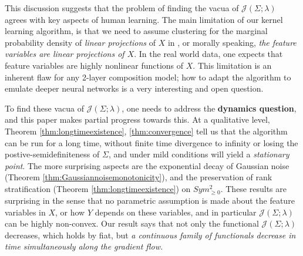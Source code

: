 \documentclass[a4paper]{article}
\theoremstyle{definition}
\newcommand{\1}{\mathbbm{1}}
\begin{document}
	
	
	
	This discussion suggests that the problem of finding the vacua of $\mathcal{J}(\Sigma;\lambda)$ agrees with key aspects of human learning. The main limitation of our kernel learning algorithm, is that we need to assume clustering for the marginal probability density of \emph{linear projections} of $X$ in \cite{RuanLi}, or morally speaking, \emph{the feature variables are linear projections of $X$}. In the real world data, one expects that feature variables are highly nonlinear functions of $X$. This limitation is an inherent flaw for any 2-layer composition model; how to adapt the algorithm to emulate deeper neural networks is a very interesting and open question.
	
	
	
	
	
	
	
	To find these vacua of $\mathcal{J}(\Sigma;\lambda)$, one needs to address the \textbf{dynamics question}, and this paper makes partial progress towards this. At a qualitative level, Theorem \ref{thm:longtimeexistence}, \ref{thm:convergence} tell us that the algorithm can be run for a long time, without finite time divergence to infinity or losing the postive-semidefiniteness of $\Sigma$, and under mild conditions will yield a \emph{stationary point}. The more surprising aspects are the exponential decay of Gaussian noise (Theorem \ref{thm:Gaussiannoisemonotonicity}), and the preservation of rank stratification (Theorem \ref{thm:longtimeexistence}) on $Sym^2_{\geq 0}$. These results are surprising in the sense that no parametric assumption is made about the feature variables in $X$, or how $Y$ depends on these variables, and in particular $\mathcal{J}(\Sigma;\lambda)$ can be highly non-convex. Our result says that not only the functional $\mathcal{J}(\Sigma;\lambda)$ decreases, which holds by fiat, but \emph{a continuous family of functionals decrease in time simultaneously along the  gradient flow.}
	
	
	
	
	
	
	
	
	
\end{document}
